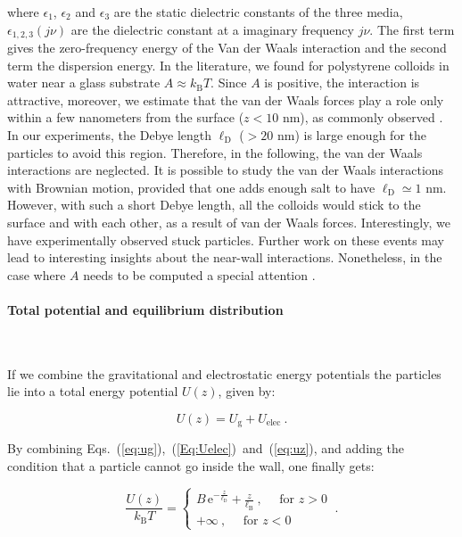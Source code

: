 where $\epsilon_1$, $\epsilon_2$ and $\epsilon_3$ are the static dielectric constants of the three media, $\epsilon_{1,2,3} (j\nu)$ are the  dielectric constant at a imaginary frequency $ j \nu$. The first term gives the zero-frequency energy of the Van der Waals interaction and the second term the dispersion energy. In the literature, we found for polystyrene colloids in water near a glass substrate $A\approx k_\mathrm{B}T$. Since $A$ is positive, the interaction is attractive, moreover, we estimate that the van der Waals forces play a role only within a few nanometers from the surface ($z < 10$ nm), as commonly observed \cite{prieve_measurement_1999}. In our experiments, the Debye length $\ell _\mathrm{D}$ ($>20$ nm) is large enough for the particles to avoid this region. Therefore, in the following, the van der Waals interactions are neglected. It is possible to study the van der Waals interactions with Brownian motion, provided that one adds enough salt to have $\ell_\mathrm{D} \simeq 1$ nm. However, with such a short Debye length, all the colloids would stick to the surface and with each other, as a result of van der Waals forces. Interestingly, we have experimentally observed stuck particles. Further work on these events may lead to interesting insights about the near-wall interactions. Nonetheless, in the case where $A$ needs to be computed a special attention \cite{parsegian_van_2005}.



\paragraph{Total potential and equilibrium distribution}\mbox{}\\
\label{test}
\vspace{0.10cm}

If we combine the gravitational and electrostatic energy potentials the particles lie into a total energy potential $U(z)$, given by:

\begin{equation}
	U(z) = U_\mathrm{g} + U_\mathrm{elec}~.
	\label{eq:uz}
\end{equation}

By combining Eqs.~(\ref{eq:ug}),~(\ref{Eq:Uelec})~and~(\ref{eq:uz}), and adding the condition that a particle cannot go inside the wall, one finally gets:

\begin{equation}
	\frac{U(z)}{k_\mathrm{B}T} =  \left\{
	\begin{array}{l}
		\displaystyle B\,\textrm{e}^{-\frac{z}{\ell_\mathrm{D}}} + \frac{z}{\ell_\mathrm{B}}\ ,\quad \text{ for } z>0 \\
		+\infty\ ,\quad  \text{ for } z < 0
	\end{array}
	\right. \ .
	\label{Eq:PDF}
\end{equation}

